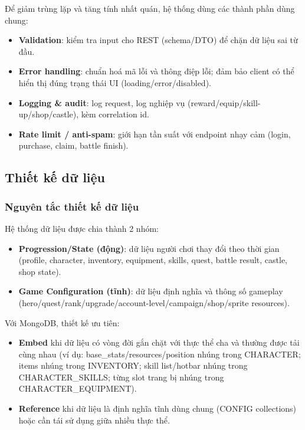 Để giảm trùng lặp và tăng tính nhất quán, hệ thống dùng các thành phần dùng chung:
\begin{itemize}
    \item \textbf{Validation}: kiểm tra input cho REST (schema/\allowbreak DTO) để chặn dữ liệu sai từ đầu.
    \item \textbf{Error handling}: chuẩn hoá mã lỗi và thông điệp lỗi; đảm bảo client có thể hiển thị đúng trạng thái UI (loading/\allowbreak error/\allowbreak disabled).
    \item \textbf{Logging \& audit}: log request, log nghiệp vụ (reward/\allowbreak equip/\allowbreak skill-up/\allowbreak shop/\allowbreak castle), kèm correlation id.
    \item \textbf{Rate limit / anti-spam}: giới hạn tần suất với endpoint nhạy cảm (login, purchase, claim, battle finish).
\end{itemize}

\subsection{Thiết kế dữ liệu}
\label{subsec:design-data}

\subsubsection{Nguyên tắc thiết kế dữ liệu}
\label{subsubsec:design-data-principles}

Hệ thống dữ liệu được chia thành 2 nhóm:
\begin{itemize}
    \item \textbf{Progression/\allowbreak State (động)}: dữ liệu người chơi thay đổi theo thời gian (profile, character, inventory, equipment, skills, quest, battle result, castle, shop state).
    \item \textbf{Game Configuration (tĩnh)}: dữ liệu định nghĩa và thông số gameplay (hero/\allowbreak quest/\allowbreak rank/\allowbreak upgrade/\allowbreak account-level/\allowbreak campaign/\allowbreak shop/\allowbreak sprite resources).
\end{itemize}

Với MongoDB, thiết kế ưu tiên:
\begin{itemize}
    \item \textbf{Embed} khi dữ liệu có vòng đời gắn chặt với thực thể cha và thường được tải cùng nhau (ví dụ: base\_stats/\allowbreak resources/\allowbreak position nhúng trong CHARACTER; items nhúng trong INVENTORY; skill list/\allowbreak hotbar nhúng trong CHARACTER\_SKILLS; từng slot trang bị nhúng trong CHARACTER\_EQUIPMENT).
    \item \textbf{Reference} khi dữ liệu là định nghĩa tĩnh dùng chung (CONFIG collections) hoặc cần tái sử dụng giữa nhiều thực thể.
\end{itemize}

